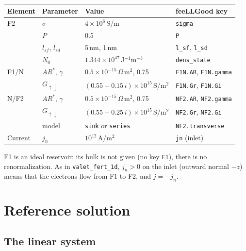 \documentclass[11pt,a4paper]{article}
\begin{document}
\begin{center}
\renewcommand{\arraystretch}{1.2}
\begin{tabular}{llll}
  \toprule
  Element & Parameter & Value & feeLLGood key \\
  \midrule
  F2 & $\sigma$ & $4\times10^6$\,S/m & \texttt{sigma} \\
    & $P$ & 0.5 & \texttt{P} \\
    & $l_{sf}$, $l_{sd}$ & 5\,nm, 1\,nm & \texttt{l\_sf}, \texttt{l\_sd} \\
    & $N_0$ & $1.344\times10^{47}$\,J$^{-1}$m$^{-3}$ & \texttt{dens\_state} \\
  F1/N & $AR^*$, $\gamma$ & $0.5\times10^{-15}\,\Omega\,$m$^2$, 0.75
    & \texttt{F1N.AR}, \texttt{F1N.gamma} \\
    & $G_{\uparrow\downarrow}$ & $(0.55 + 0.15\,i)\times10^{15}$\,S/m$^2$
    & \texttt{F1N.Gr}, \texttt{F1N.Gi} \\
  N/F2 & $AR^*$, $\gamma$ & $0.5\times10^{-15}\,\Omega\,$m$^2$, 0.75
    & \texttt{NF2.AR}, \texttt{NF2.gamma} \\
    & $G_{\uparrow\downarrow}$ & $(0.55 + 0.25\,i)\times10^{15}$\,S/m$^2$
    & \texttt{NF2.Gr}, \texttt{NF2.Gi} \\
    & model & \texttt{sink} or \texttt{series} & \texttt{NF2.transverse} \\
  Current & $j_n$ & $10^{12}$\,A/m$^2$ & \texttt{jn} (inlet) \\
  \bottomrule
\end{tabular}
\end{center}
F1 is an ideal reservoir: its bulk is not given (no key \texttt{F1}),
there is no renormalization. As in \texttt{valet\_fert\_1d}, $j_n > 0$ on
the inlet (outward normal $-z$) means that the electrons flow from F1 to
F2, and $j = -j_n$.

\section{Reference solution}

\subsection{The linear system}
\end{document}
